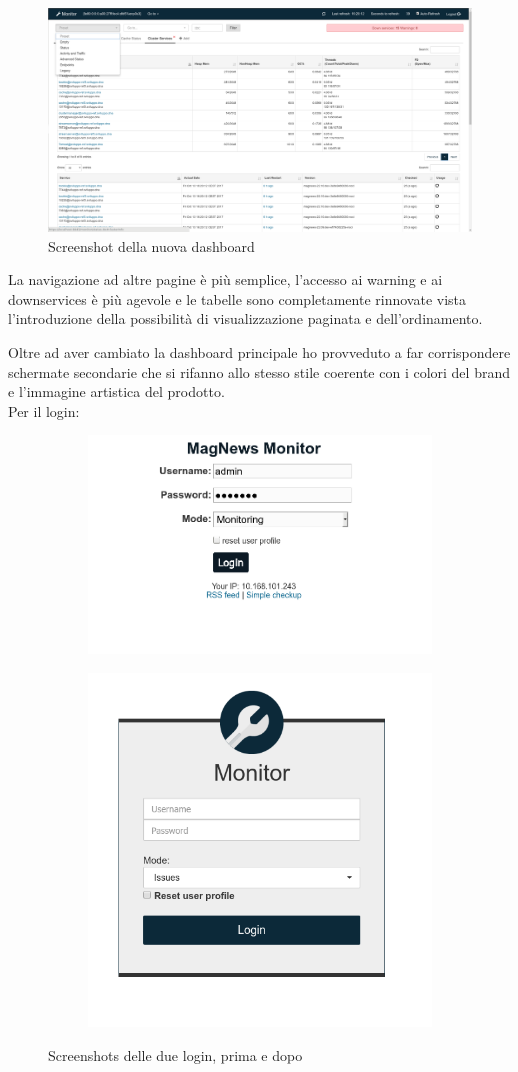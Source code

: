 \documentclass[a4paper]{article}
\begin{document}
\begin{figure}[H]
	\includegraphics[width=\textwidth]{dashboard_new.png}
	\centering
	\caption{Screenshot della nuova dashboard}
\end{figure}
La navigazione ad altre pagine è più semplice, l'accesso ai warning e ai downservices
è più agevole e le tabelle sono completamente rinnovate vista l'introduzione della possibilità di
visualizzazione paginata e dell'ordinamento.
\par Oltre ad aver cambiato la dashboard principale ho provveduto a far corrispondere schermate secondarie
che si rifanno allo stesso stile coerente con i colori del brand e l'immagine artistica del prodotto.\\
Per il login:
\begin{figure}[H]
	\centering
	\begin{subfigure}
	  \centering
	  \includegraphics[width=0.45\linewidth]{login_old.png}
	\end{subfigure}%
	\begin{subfigure}
	  \centering
	  \includegraphics[width=0.45\linewidth]{login_new.png}
	\end{subfigure}
	\caption{Screenshots delle due login, prima e dopo}
\end{figure}
\end{document}
